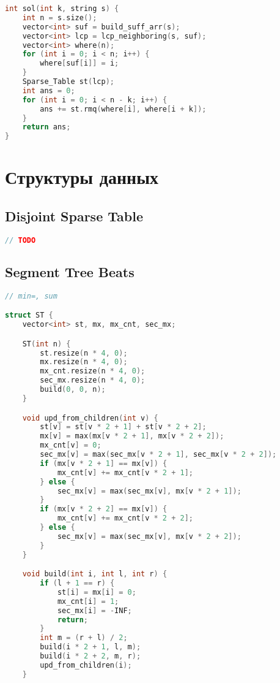 \documentclass[10pt,a4paper,landscape,twosided]{extarticle}
\begin{document}
\begin{multicols*}{3}
\begin{lstlisting}[language=C++]
int sol(int k, string s) {
    int n = s.size();
    vector<int> suf = build_suff_arr(s);
    vector<int> lcp = lcp_neighboring(s, suf);
    vector<int> where(n);
    for (int i = 0; i < n; i++) {
        where[suf[i]] = i;
    }
    Sparse_Table st(lcp);
    int ans = 0;
    for (int i = 0; i < n - k; i++) {
        ans += st.rmq(where[i], where[i + k]);
    }
    return ans;
}

\end{lstlisting}

\section{Структуры данных}

\subsection{Disjoint Sparse Table}
\begin{lstlisting}[language=C++]
// TODO
\end{lstlisting}

\subsection{Segment Tree Beats}
\begin{lstlisting}[language=C++]
// min=, sum

struct ST {
    vector<int> st, mx, mx_cnt, sec_mx;

    ST(int n) {
        st.resize(n * 4, 0);
        mx.resize(n * 4, 0);
        mx_cnt.resize(n * 4, 0);
        sec_mx.resize(n * 4, 0);
        build(0, 0, n);
    }

    void upd_from_children(int v) {
        st[v] = st[v * 2 + 1] + st[v * 2 + 2];
        mx[v] = max(mx[v * 2 + 1], mx[v * 2 + 2]);
        mx_cnt[v] = 0;
        sec_mx[v] = max(sec_mx[v * 2 + 1], sec_mx[v * 2 + 2]);
        if (mx[v * 2 + 1] == mx[v]) {
            mx_cnt[v] += mx_cnt[v * 2 + 1];
        } else {
            sec_mx[v] = max(sec_mx[v], mx[v * 2 + 1]);
        }
        if (mx[v * 2 + 2] == mx[v]) {
            mx_cnt[v] += mx_cnt[v * 2 + 2];
        } else {
            sec_mx[v] = max(sec_mx[v], mx[v * 2 + 2]);
        }
    }

    void build(int i, int l, int r) {
        if (l + 1 == r) {
            st[i] = mx[i] = 0;
            mx_cnt[i] = 1;
            sec_mx[i] = -INF;
            return;
        }
        int m = (r + l) / 2;
        build(i * 2 + 1, l, m);
        build(i * 2 + 2, m, r);
        upd_from_children(i);
    }


\end{lstlisting}
\end{multicols*}
\end{document}
